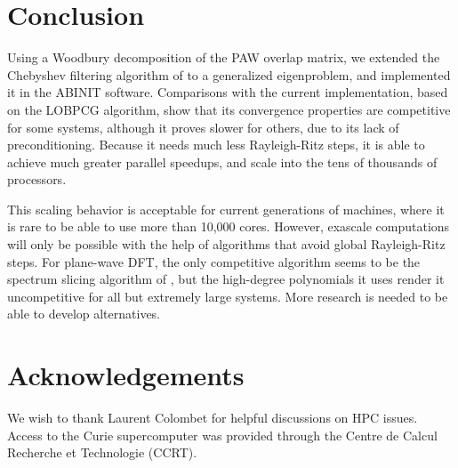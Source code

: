 \documentclass[11pt]{elsarticle}
\begin{document}
\section{Conclusion}
Using a Woodbury decomposition of the PAW overlap matrix, we extended
the Chebyshev filtering algorithm of \cite{seq_chebfi,
  parallel_chebfi} to a generalized eigenproblem, and implemented it
in the ABINIT software. Comparisons with the current implementation,
based on the LOBPCG algorithm, show that its convergence properties
are competitive for some systems, although it proves slower for
others, due to its lack of preconditioning. Because it needs much less
Rayleigh-Ritz steps, it is able to achieve much greater parallel
speedups, and scale into the tens of thousands of processors.

This scaling behavior is acceptable for current generations of
machines, where it is rare to be able to use more than 10,000
cores. However, exascale computations will only be possible with the
help of algorithms that avoid global Rayleigh-Ritz steps. For
plane-wave DFT, the only competitive algorithm seems to be the
spectrum slicing algorithm of \cite{slicing}, but the high-degree
polynomials it uses render it uncompetitive for all but extremely
large systems. More research is needed to be able to develop
alternatives.

\section*{Acknowledgements}
We wish to thank Laurent Colombet for helpful discussions on HPC
issues. Access to the Curie supercomputer was provided through the
Centre de Calcul Recherche et Technologie (CCRT).


\end{document}
